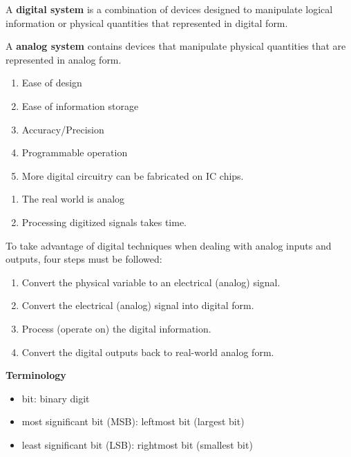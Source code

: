     \par A \textbf{digital system} is a combination of devices designed to manipulate logical
    information or physical quantities that represented in digital form.
    \par A \textbf{analog system} contains devices that manipulate physical quantities that
    are represented in analog form.
    \begin{enumerate}
      \item Ease of design
      \item Ease of information storage
      \item Accuracy/Precision
      \item Programmable operation
      \item More digital circuitry can be fabricated \footnotemark on IC chips.
    \end{enumerate}
    \begin{enumerate}
      \item The real world is analog
      \item Processing digitized signals takes time.
    \end{enumerate}
    \par To take advantage of digital techniques when dealing with analog inputs and outputs,
    four steps must be followed:
    \begin{enumerate}
      \item Convert the physical variable to an electrical (analog) signal.
      \item Convert the electrical (analog) signal into digital form.
      \item Process (operate on) the digital information.
      \item Convert the digital outputs back to real-world analog form.
    \end{enumerate}
  
  \par \textbf{Terminology}
  \begin{itemize}
    \item bit: binary digit
    \item most significant bit (MSB): leftmost bit (largest bit)
    \item least significant bit (LSB): rightmost bit (smallest bit)
  \end{itemize}

